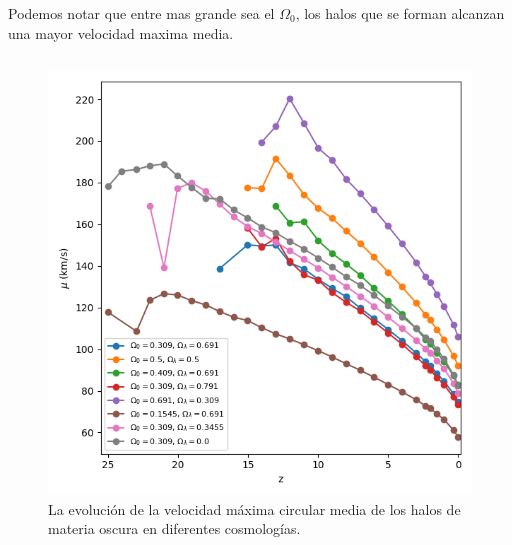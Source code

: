 \documentclass{beamer}
\begin{document}
	\begin{frame}
		 {\small Podemos notar que entre mas grande sea el $\Omega_0$, los halos que se forman alcanzan una mayor velocidad maxima media.}
				
		\begin{columns}[t]
			\begin{column}{.5\textwidth}
				\begin{figure}
					\centering
					\includegraphics[scale=0.27]{Conc/VelMax_Mean_Conc.png}
					\caption{\footnotesize La evolución de la velocidad máxima circular media de los halos de materia oscura en diferentes cosmologías.}
					\label{fig:Conc-VelMaxMean}
				\end{figure}
			\end{column}


\end{columns}
\end{frame}
\end{document}
